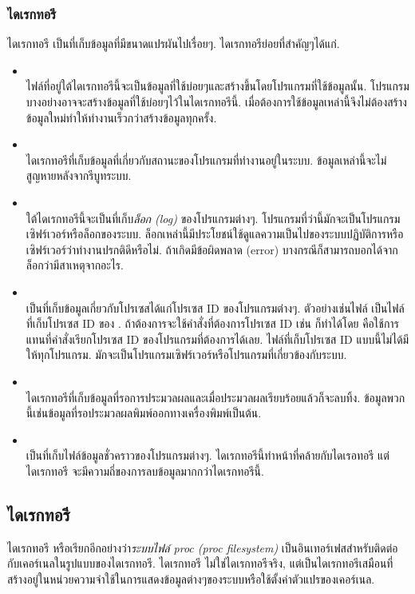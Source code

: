 \begin{thwbr}
\subsubsection{ไดเรกทอรี }
ไดเรกทอรี  เป็นที่เก็บข้อมูลที่มีขนาดแปรผันไปเรื่อยๆ. ไดเรกทอรีย่อยที่สำคัญๆได้แก่.
\begin{itemize}
\item {}\\
ไฟล์ที่อยู่ใต้ไดเรกทอรีนี้จะเป็นข้อมูลที่ใช้บ่อยๆและสร้างขึ้นโดยโปรแกรมที่ใช้ข้อมูลนั้น. โปรแกรมบางอย่างอาจจะสร้างข้อมูลที่ใช้บ่อยๆไว้ในไดเรกทอรีนี้. เมื่อต้องการใช้ข้อมูลเหล่านี้จึงไม่ต้องสร้างข้อมูลใหม่ทำให้ทำงานเร็วกว่าสร้างข้อมูลทุกครั้ง.
\item {}\\
ไดเรกทอรีที่เก็บข้อมูลที่เกี่ยวกับสถานะของโปรแกรมที่ทำงานอยู่ในระบบ. ข้อมูลเหล่านี้จะไม่สูญหายหลังจากรีบูทระบบ. 
\item {}\\
ใต้ไดเรกทอรีนี้จะเป็นที่เก็บ\emph{ล็อก (log)} ของโปรแกรมต่างๆ. โปรแกรมที่ว่านี้มักจะเป็นโปรแกรมเซิฟร์เวอร์หรือล็อกของระบบ. ล็อกเหล่านี้มีประโยชน์ใช้ดูแลความเป็นไปของระบบปฏิบัติการหรือเซิฟร์เวอร์ว่าทำงานปรกติดีหรือไม่. ถ้าเกิดมีข้อผิดพลาด (error) บางกรณีก็สามารถบอกได้จากล็อกว่ามีสาเหตุจากอะไร.
\item {}\\
เป็นที่เก็บข้อมูลเกี่ยวกับโปรเซสได้แก่โปรเซส ID ของโปรแกรมต่างๆ. ตัวอย่างเช่นไฟล์  เป็นไฟล์ที่เก็บโปรเซส ID ของ . ถ้าต้องการจะใช้คำสั่งที่ต้องการโปรเซส ID เช่น  ก็ทำได้โดย  คือใช้การแทนที่คำสั่งเรียกโปรเซส ID ของโปรแกรมที่ต้องการได้เลย. ไฟล์ที่เก็บโปรเซส ID แบบนี้ไม่ได้มีให้ทุกโปรแกรม. มักจะเป็นโปรแกรมเซิฟร์เวอร์หรือโปรแกรมที่เกี่ยวข้องกับระบบ.
\item {}\\
ไดเรกทอรีที่เก็บข้อมูลที่รอการประมวลผลและเมื่อประมวลผลเรียบร้อยแล้วก็จะลบทิ้ง. ข้อมูลพวกนี้เช่นข้อมูลที่รอประมวลผลพิมพ์ออกทางเครื่องพิมพ์เป็นต้น.
\item {}\\
เป็นที่เก็บไฟล์ข้อมูลชั่วคราวของโปรแกรมต่างๆ. ไดเรกทอรีนี้ทำหน้าที่คล้ายกับไดเรอทอรี  แต่ไดเรกทอรี  จะมีความถี่ของการลบข้อมูลมากกว่าไดเรกทอรีนี้. 
\end{itemize}

\subsection{ไดเรกทอรี }
ไดเรกทอรี  หรือเรียกอีกอย่างว่า\emph{ระบบไฟล์ proc (proc filesystem)} \cite{kerneldoc} เป็นอินเทอร์เฟสสำหรับติดต่อกับเคอร์เนลในรูปแบบของไดเรกทอรี. ไดเรกทอรี  ไม่ใช่ไดเรกทอรีจริง, แต่เป็นไดเรกทอรีเสมือนที่สร้างอยู่ในหน่วยความจำใช้ในการแสดงข้อมูลต่างๆของระบบหรือใช้ตั้งค่าตัวแปรของเคอร์เนล. 


\end{thwbr}
